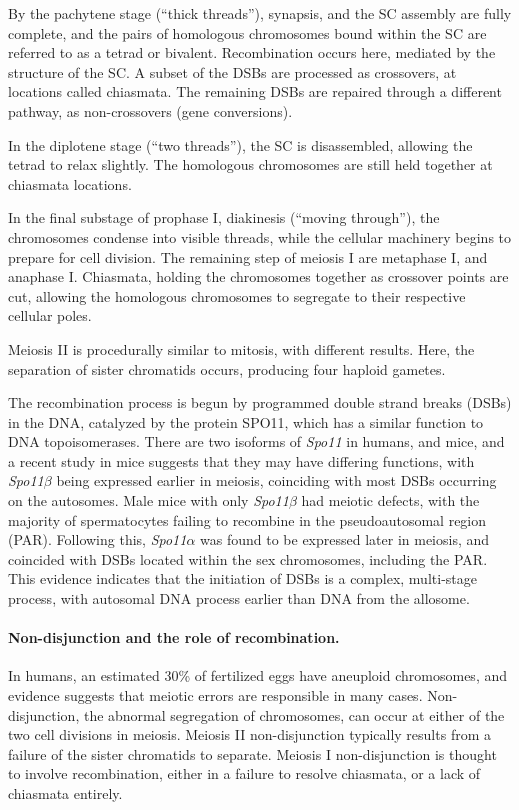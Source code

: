 By the pachytene stage (``thick threads''), synapsis, and the SC assembly are fully complete, and the pairs of homologous chromosomes bound within the SC are referred to as a tetrad or bivalent.
Recombination occurs here, mediated by the structure of the SC.
A subset of the DSBs are processed as crossovers, at locations called chiasmata.
The remaining DSBs are repaired through a different pathway, as non-crossovers (gene conversions).

In the diplotene stage (``two threads''), the SC is disassembled, allowing the tetrad to relax slightly.
The homologous chromosomes are still held together at chiasmata locations.

In the final substage of prophase I, diakinesis (``moving through''), the chromosomes condense into visible threads, while the cellular machinery begins to prepare for cell division.
The remaining step of meiosis I are metaphase I, and anaphase I.
Chiasmata, holding the chromosomes together as crossover points are cut, allowing the homologous chromosomes to segregate to their respective cellular poles.

Meiosis II is procedurally similar to mitosis, with different results.
Here, the separation of sister chromatids occurs, producing four haploid gametes.




The recombination process is begun by programmed double strand breaks (DSBs) in the DNA, catalyzed by the protein SPO11, which has a similar function to DNA topoisomerases\cite{DeMassy2013}.
There are two isoforms of \textit{Spo11} in humans, and mice, and a recent study in mice suggests that they may have differing functions, with \textit{Spo11$\beta$} being expressed earlier in meiosis, coinciding with most DSBs occurring on the autosomes.
Male mice with only \textit{Spo11$\beta$} had meiotic defects, with the majority of spermatocytes failing to recombine in the pseudoautosomal region (PAR).
Following this, \textit{Spo11$\alpha$} was found to be expressed later in meiosis, and coincided with DSBs located within the sex chromosomes, including the PAR\cite{Kauppi2011,DeMassy2013}.
This evidence indicates that the initiation of DSBs is a complex, multi-stage process, with autosomal DNA process earlier than DNA from the allosome.




\paragraph{Non-disjunction and the role of recombination.}
In humans, an estimated 30\% of fertilized eggs have aneuploid chromosomes\cite{Hassold2001}, and evidence suggests that meiotic errors are responsible in many cases.
Non-disjunction, the abnormal segregation of chromosomes, can occur at either of the two cell divisions in meiosis.
Meiosis II non-disjunction typically results from a failure of the sister chromatids to separate.
Meiosis I non-disjunction is thought to involve recombination, either in a failure to resolve chiasmata, or a lack of chiasmata entirely.

